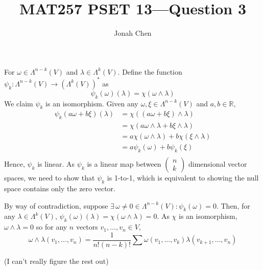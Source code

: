 \documentclass{exam}
\title{MAT257 PSET 13---Question 3}
\author{Jonah Chen}
\date{}
\numberwithin{equation}{section}
\newcommand{\R}{\mathbb{R}}
\begin{document}
    \sffamily
    \maketitle
    For \(\omega\in\Lambda^{n-k}(V)\) and \(\lambda\in\Lambda^k(V)\). Define the function \(\psi_k:\Lambda^{n-k}(V)\to(\Lambda^k(V))^*\) as
    \[
        \psi_k(\omega)(\lambda) = \chi(\omega\wedge\lambda)
    \]
    We claim \(\psi_k\) is an isomorphism. Given any \(\omega,\xi\in\Lambda^{n-k}(V)\) and \(a,b\in\R\),
    \begin{align*}
        \psi_k(a\omega+b\xi)(\lambda)
        &=\chi((a\omega+b\xi)\wedge\lambda)\\
        &=\chi(a\omega\wedge\lambda+b\xi\wedge\lambda)\\
        &=a\chi(\omega\wedge\lambda)+b\chi(\xi\wedge\lambda)\\
        &=a\psi_k(\omega)+b\psi_k(\xi)\\
    \end{align*}
    Hence, \(\psi_k\) is linear. As \(\psi_k\) is a linear map between \(\begin{pmatrix}
        n\\k
    \end{pmatrix}\) dimensional vector spaces, we need to show that \(\psi_k\) is 1-to-1, which is equivalent to showing the null space contains only the zero vector. 
    
    By way of contradiction, suppose \(\exists\,\omega\neq0\in\Lambda^{n-k}(V): \psi_k(\omega)=0\). Then, for any \(\lambda\in\Lambda^{k}(V)\), $\psi_k(\omega)(\lambda)=\chi(\omega\wedge\lambda)=0$. As \(\chi\) is an isomorphism, \(\omega\wedge\lambda=0\) so for any $n$ vectors $v_1,\dots,v_n\in V$,
    \[
        \omega\wedge\lambda(v_1,\dots,v_n)=\frac{1}{n!(n-k)!}\sum\omega(v_1,\dots,v_k)\lambda(v_{k+1},\dots,v_n)
    \]
    
    (I can't really figure the rest out)
\end{document}
